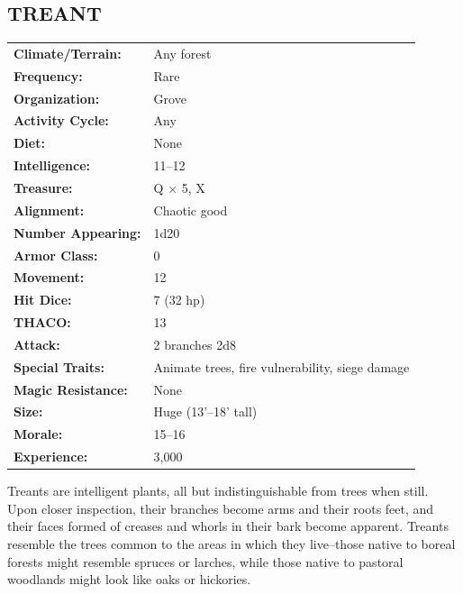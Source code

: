 \begin{multicols}{2}
\noindent
\begin{minipage}{\columnwidth}

\vspace{1em}

\subsection{TREANT}

\noindent \begin{tabular}{p{}p{}}
\textbf{Climate/Terrain:}	& Any forest	\\
\textbf{Frequency:} 		& Rare	\\
\textbf{Organization:} 		& Grove	\\
\textbf{Activity Cycle:} 	& Any	\\
\textbf{Diet:} 				& None	\\
\textbf{Intelligence:} 		& 11--12	\\
\textbf{Treasure:} 			& Q $\times$ 5, X	\\
\textbf{Alignment:} 		& Chaotic good	\\
\hline
\textbf{Number Appearing:} 	& 1d20	\\
\textbf{Armor Class:} 		& 0	\\
\textbf{Movement:} 			& 12	\\
\textbf{Hit Dice:} 			& 7 (32 hp)	\\
\textbf{THACO:} 			& 13	\\
\textbf{Attack:} 			& 2 branches 2d8	\\
\textbf{Special Traits:} & Animate trees, fire vulnerability, siege damage	\\
\textbf{Magic Resistance:} 	& None	\\
\textbf{Size:} 				& Huge (13'--18' tall)	\\
\textbf{Morale:} 			& 15--16	\\
\textbf{Experience:} 		& 3,000	\\ %
\end{tabular}

\end{minipage}

Treants are intelligent plants, all but indistinguishable from trees when still. Upon closer inspection, their branches become arms and their roots feet, and their faces formed of creases and whorls in their bark become apparent. Treants resemble the trees common to the areas in which they live--those native to boreal forests might resemble spruces or larches, while those native to pastoral woodlands might look like oaks or hickories.


\end{multicols}
